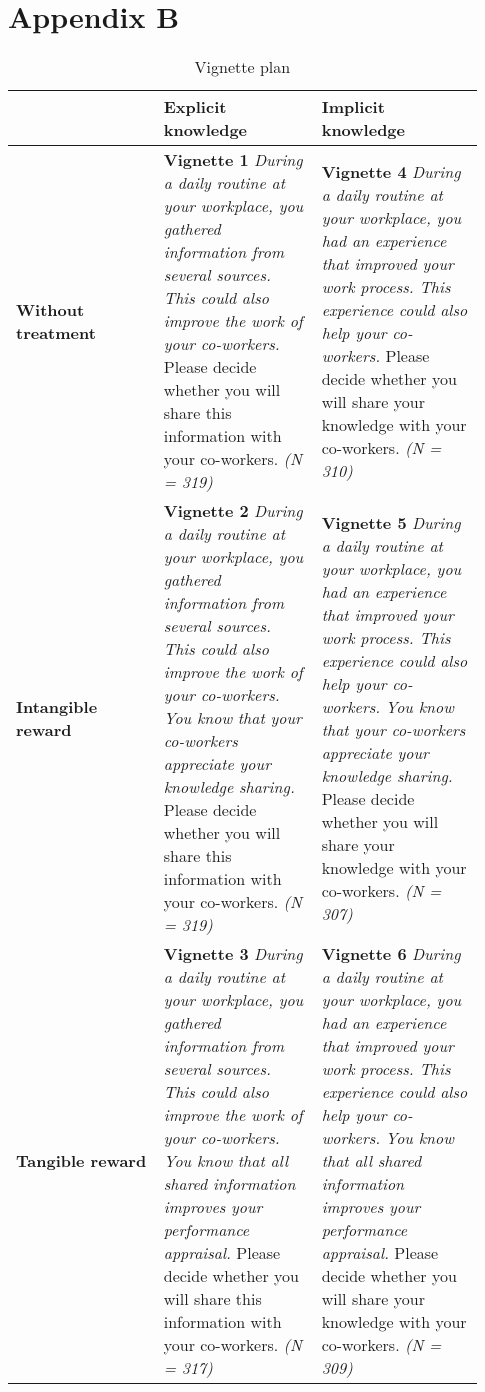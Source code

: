 \documentclass[twocolumn, issue, empirical, authordate]{jote-new-article}
\begin{document}
\section{Appendix B}


\begin{table}[h!]
\caption{Vignette plan}
\label{tab:table4}
\begin{tabularx}{\linewidth}{@{}>{\raggedright\arraybackslash}p{0.296\linewidth} >{\raggedright\arraybackslash}p{0.3106\linewidth} >{\raggedright\arraybackslash}p{0.3218\linewidth}}
      \textbf{} & \textbf{Explicit knowledge } & \textbf{Implicit knowledge }\\ \toprule
\textbf{Without treatment} & \textbf{Vignette 1 } \textit{During a daily routine at your workplace, you gathered information from several sources. This could also improve the work of your co-workers.}  Please decide whether you will share this information with your co-workers. \textit{(N = 319)} & \textbf{Vignette 4  } \textit{During a daily routine at your workplace, you had an experience that improved your work process. This experience could also help your co-workers.}  Please decide whether you will share your knowledge with your co-workers.  \textit{(N = 310)}\\ 
\textbf{Intangible reward} & \textbf{Vignette 2 } \textit{During a daily routine at your workplace, you gathered information from several sources. This could also improve the work of your co-workers.} \textit{} \textit{You know that your co-workers appreciate your knowledge sharing.} \textit{} Please decide whether you will share this information with your co-workers. \textit{(N = 319)} & \textbf{Vignette 5 } \textit{During a daily routine at your workplace, you had an experience that improved your work process. This experience could also help your co-workers.} \textit{} \textit{You know that your co-workers appreciate your knowledge sharing.} \textit{} Please decide whether you will share your knowledge with your co-workers. \textit{(N = 307)}\\ 
\textbf{Tangible reward} & \textbf{Vignette 3} \textit{During a daily routine at your workplace, you gathered information from several sources. This could also improve the work of your co-workers.} \textit{} \textit{You know that all shared information improves your performance appraisal.}  Please decide whether you will share this information with your co-workers. \textit{(N = 317)} & \textbf{Vignette 6 } \textit{During a daily routine at your workplace, you had an experience that improved your work process. This experience could also help your co-workers.} \textit{} \textit{You know that all shared information improves your performance appraisal.}  Please decide whether you will share your knowledge with your co-workers.  \textit{(N = 309)}
\end{tabularx}

\end{table} 
\end{document}
